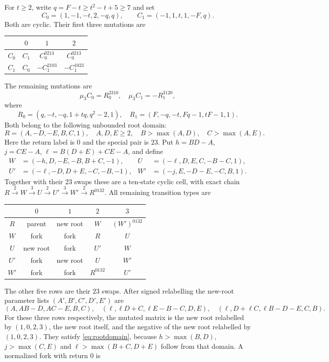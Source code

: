 For $t\ge2$, write $q=F-t\ge t^2-t+5\ge7$ and set
\[
 C_0=(1,-1,-t,2,-q,q),\qquad C_1=(-1,1,t,1,-F,q).
\]
Both are cyclic. Their first three mutations are
\begin{center}\begin{tabular}{c|ccc}
&$0$&$1$&$2$\\\hline
$C_0$&$C_1$&$C_0^{0213}$&$C_0^{0213}$\\
$C_1$&$C_0$&$-C_1^{2103}$&$-C_1^{1023}$
\end{tabular}\end{center}
The remaining mutations are
\[
 \mu_3C_0=R_0^{2310},\quad \mu_3C_1=-R_1^{3120},
\]
where
\[
 R_0=(q,-t,-q,1+tq,q^2-2,1),\quad
 R_1=(F,-q,-t,Fq-1,tF-1,1).
\]
Both belong to the following unbounded root domain:
\begin{equation}\label{eq:rootdomain}
 R=(A,-D,-E,B,C,1),\quad A,D,E\ge2,\quad B>\max(A,D),\quad C>\max(A,E).
\end{equation}
Here the return label is $0$ and the special pair is $23$. Put
$h=BD-A$, $j=CE-A$, $\ell=B(D+E)+CE-A$, and define
\begin{align*}
 W&=(-h,D,-E,-B,B+C,-1),& U&=(-\ell,D,E,C,-B-C,1),\\
 U'&=(-\ell,-D,D+E,-C,-B,-1),& W'&=(-j,E,-D-E,-C,B,1).
\end{align*}
Together with their $23$ swaps these are a ten-state cyclic cell, with exact chain
$R\xrightarrow{2}W\xrightarrow{3}U\xrightarrow{2}U'\xrightarrow{3}W'\xrightarrow{2}R^{0132}$.
All remaining transition types are
\begin{center}\begin{tabular}{c|cccc}\toprule
&$0$&$1$&$2$&$3$\\\midrule
$R$&parent&new root&$W$&$(W')^{0132}$\\
$W$&fork&fork&$R$&$U$\\
$U$&new root&fork&$U'$&$W$\\
$U'$&fork&new root&$U$&$W'$\\
$W'$&fork&fork&$R^{0132}$&$U'$\\\bottomrule
\end{tabular}\end{center}
The other five rows are their $23$ swaps. After signed relabelling the new-root parameter lists $(A',B',C',D',E')$ are
\[
 (A,AB-D,AC-E,B,C),\quad
 (\ell,\ell D+C,\ell E-B-C,D,E),\quad
 (\ell,D+\ell C,\ell B-D-E,C,B).
\]
For these three rows respectively, the mutated matrix is the new root relabelled by $(1,0,2,3)$, the new root itself, and the negative of the new root relabelled by $(1,0,2,3)$. They satisfy \eqref{eq:rootdomain}, because $h>\max(B,D)$, $j>\max(C,E)$ and $\ell>\max(B+C,D+E)$ follow from that domain. A normalized fork with return $0$ is
